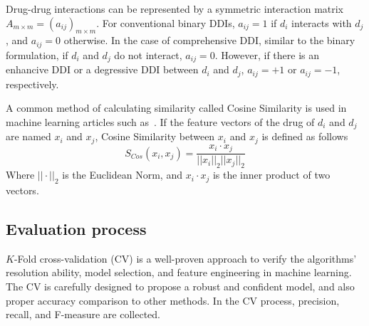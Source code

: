 \documentclass[unnumsec,webpdf,contemporary,large]{oup-authoring-template}%
\theoremstyle{thmstyleone}%
\theoremstyle{thmstyletwo}%
\theoremstyle{thmstylethree}%
\begin{document}
Drug-drug interactions can be represented by a symmetric interaction matrix $A_{m\times m} = (a_{ij})_{m \times m}$. For conventional binary DDIs, $a_{ij} = 1$ if $d_i$ interacts with $d_j$, and $a_{ij} = 0$ otherwise. In the case of comprehensive DDI, similar to the binary formulation, if $d_i$ and $d_j$ do not interact, $a_{ij} = 0$. However, if there is an enhancive DDI or a degressive DDI between $d_i$ and $d_j$, $a_{ij} = +1$ or $a_{ij} = -1$, respectively.

A common method of calculating similarity called Cosine Similarity is used in machine learning articles such as~\cite{zhang2016, Zhang2018}. If the feature vectors of the drug of $d_i$ and $d_j$ are named $x_i$ and $x_j$, Cosine Similarity between $x_i$ and $x_j$ is defined as follows
\begin{equation}
S_{Cos} (x_i, x_j) = \frac{x_i \cdot x_j}{||x_i ||_2 ||x_j||_2}                      
\end{equation}
Where $|| \cdot ||_2$ is the Euclidean Norm, and $x_i \cdot x_j$ is the inner product of two vectors.
\subsection{Evaluation process}\label{subsec2}
$K$-Fold cross-validation (CV) is a well-proven approach to verify the algorithms’ resolution ability, model selection, and feature engineering in machine learning. The CV is carefully designed to propose a robust and confident model, and also proper accuracy comparison to other methods. In the CV process, precision, recall, and F-measure are collected.
\end{document}
